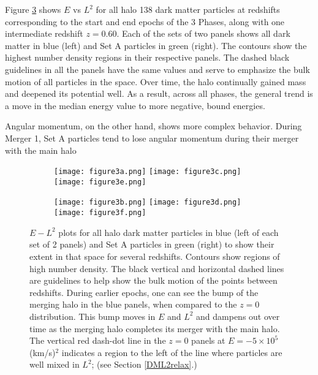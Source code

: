 \documentclass[a4paper,11pt]{article}
\begin{document}
Figure \ref{L2vEcontour} shows $E$ vs $L^2$ for all halo 138 dark matter particles at redshifts corresponding to the start and end epochs of the 3 Phases, 
along with one intermediate redshift $z=0.60$.  Each of the sets of two 
panels shows all dark matter in blue (left) and Set A particles in green (right).  The contours show the highest number density regions in their respective panels.
The dashed black guidelines in all the panels have the same values and serve to emphasize the bulk motion of all particles in the space.  
Over time, the halo continually gained mass and deepened its potential well.  As a result, across all phases, the general trend is a move in the median energy 
value to more negative, bound energies.  

Angular momentum, on the other hand, shows more complex behavior.  During Merger 1, Set A particles tend to lose angular momentum during their merger with the 
main halo 
\begin{landscape}
\begin{figure}
\vskip -2.4cm

\begin{subfigure}{.75\textwidth}
\texttt{[image: figure3a.png]}
\texttt{[image: figure3c.png]}
  \texttt{[image: figure3e.png]}

  \label{fig:sub1}
\end{subfigure}%
\begin{subfigure}{.25\textwidth}
\texttt{[image: figure3b.png]}
  \texttt{[image: figure3d.png]}
  \texttt{[image: figure3f.png]}

  \label{fig:sub2}
\end{subfigure}
\hskip -1.0cm
\caption{$E-L^2$ plots for all halo dark matter particles in blue (left of each set of 2 panels) and Set A particles in green (right) to show 
their extent in that space for several redshifts.  Contours show regions of high number density.  The 
black vertical and horizontal dashed lines are guidelines to help show the bulk motion of the points between redshifts.  During earlier 
epochs, one can see the bump of the merging halo in the blue panels,  when compared to the $z=0$ distribution.  This bump moves in $E$ and $L^2$ and dampens out over time as the merging 
halo completes its merger with the main halo.  The vertical red dash-dot line in the $z=0$ panels at $E=-5\times10^5$(km/s)$^2$ indicates a region to 
the left of the line where particles are well mixed in $L^2$; (see Section \ref{DML2relax}.)}
\label{L2vEcontour}
\end{figure}
\end{landscape}
\end{document}
